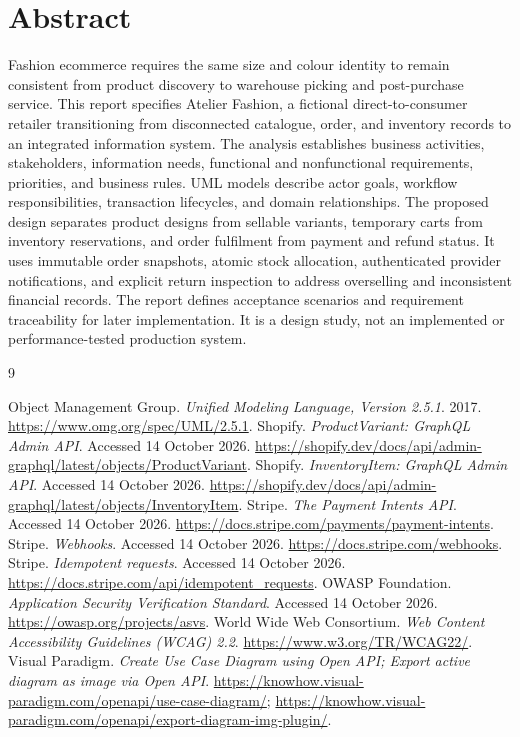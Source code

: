 \documentclass[12pt,a4paper]{report}
\begin{document}
\chapter*{Abstract}
Fashion ecommerce requires the same size and colour identity to remain consistent from product discovery to warehouse picking and post-purchase service. This report specifies Atelier Fashion, a fictional direct-to-consumer retailer transitioning from disconnected catalogue, order, and inventory records to an integrated information system. The analysis establishes business activities, stakeholders, information needs, functional and nonfunctional requirements, priorities, and business rules. UML models describe actor goals, workflow responsibilities, transaction lifecycles, and domain relationships. The proposed design separates product designs from sellable variants, temporary carts from inventory reservations, and order fulfilment from payment and refund status. It uses immutable order snapshots, atomic stock allocation, authenticated provider notifications, and explicit return inspection to address overselling and inconsistent financial records. The report defines acceptance scenarios and requirement traceability for later implementation. It is a design study, not an implemented or performance-tested production system.
\tableofcontents\listoffigures\listoftables
\clearpage{}







\appendix

\renewcommand{\bibname}{References}
\begin{thebibliography}{9}
 Object Management Group. \emph{Unified Modeling Language, Version 2.5.1}. 2017. \url{https://www.omg.org/spec/UML/2.5.1}.
 Shopify. \emph{ProductVariant: GraphQL Admin API}. Accessed 14 October 2026. \url{https://shopify.dev/docs/api/admin-graphql/latest/objects/ProductVariant}.
 Shopify. \emph{InventoryItem: GraphQL Admin API}. Accessed 14 October 2026. \url{https://shopify.dev/docs/api/admin-graphql/latest/objects/InventoryItem}.
 Stripe. \emph{The Payment Intents API}. Accessed 14 October 2026. \url{https://docs.stripe.com/payments/payment-intents}.
 Stripe. \emph{Webhooks}. Accessed 14 October 2026. \url{https://docs.stripe.com/webhooks}.
 Stripe. \emph{Idempotent requests}. Accessed 14 October 2026. \url{https://docs.stripe.com/api/idempotent_requests}.
 OWASP Foundation. \emph{Application Security Verification Standard}. Accessed 14 October 2026. \url{https://owasp.org/projects/asvs}.
 World Wide Web Consortium. \emph{Web Content Accessibility Guidelines (WCAG) 2.2}. \url{https://www.w3.org/TR/WCAG22/}.
 Visual Paradigm. \emph{Create Use Case Diagram using Open API; Export active diagram as image via Open API}. \url{https://knowhow.visual-paradigm.com/openapi/use-case-diagram/}; \url{https://knowhow.visual-paradigm.com/openapi/export-diagram-img-plugin/}.
\end{thebibliography}
\end{document}
